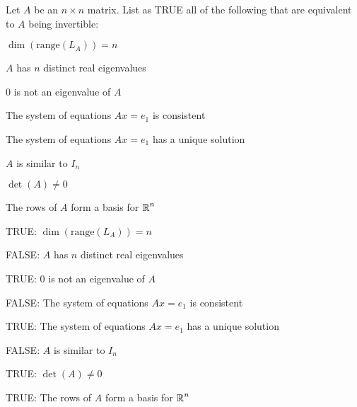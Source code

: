 \documentclass{ximera}
\author{Marty Golubitsky}
\begin{document}
\begin{exercise}\label{c8.2.a2}

Let $A$ be an $n\times n$ matrix. List as TRUE all of the following that are equivalent to $A$ being invertible:
\begin{enumeratea}
\item $\dim(\text{range}(L_A))= n$
\item $A$ has $n$ distinct real eigenvalues
\item $0$ is not an eigenvalue of $A$
\item The system of equations $Ax=e_1$ is consistent
\item The system of equations $Ax=e_1$ has a unique solution
\item $A$ is similar to $I_n$
\item $\det(A)\neq 0$
\item The rows of $A$ form a basis for $\mbox{$\Bbb{R}$}^n$
\end{enumeratea}

  
\begin{solution}

\ans 
\begin{enumeratea}
\item TRUE: $\dim(\text{range}(L_A))= n$
\item FALSE: $A$ has $n$ distinct real eigenvalues
\item TRUE: $0$ is not an eigenvalue of $A$
\item FALSE: The system of equations $Ax=e_1$ is consistent
\item TRUE: The system of equations $Ax=e_1$ has a unique solution
\item FALSE: $A$ is similar to $I_n$
\item TRUE: $\det(A)\neq 0$
\item TRUE: The rows of $A$ form a basis for $\mbox{$\Bbb{R}$}^n$
\end{enumeratea}

\end{solution}
\end{exercise}
\end{document}
